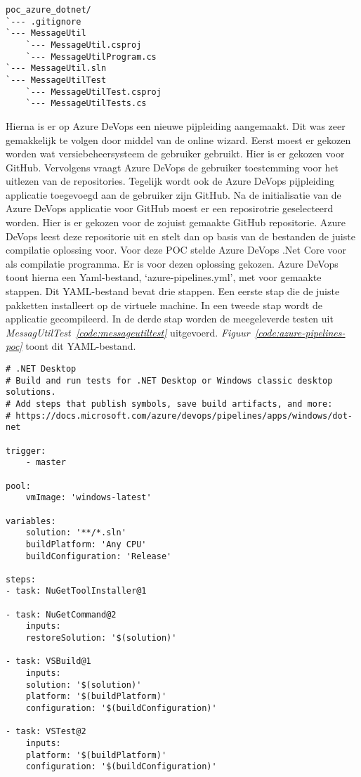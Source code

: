 \begin{lstlisting}
poc_azure_dotnet/
`--- .gitignore
`--- MessageUtil
    `--- MessageUtil.csproj
    `--- MessageUtilProgram.cs
`--- MessageUtil.sln
`--- MessageUtilTest
    `--- MessageUtilTest.csproj
    `--- MessageUtilTests.cs
\end{lstlisting}

Hierna is er op Azure DeVops een nieuwe pijpleiding aangemaakt. Dit was zeer gemakkelijk te volgen door middel van de online wizard. Eerst moest er gekozen worden wat versiebeheersysteem de gebruiker gebruikt. Hier is er gekozen voor GitHub. Vervolgens vraagt Azure DeVops de gebruiker toestemming voor het uitlezen van de repositories. Tegelijk wordt ook de Azure DeVops pijpleiding applicatie toegevoegd aan de gebruiker zijn GitHub. Na de initialisatie van de Azure DeVops applicatie voor GitHub moest er een reposirotrie geselecteerd worden. Hier is er gekozen voor de zojuist gemaakte GitHub repositorie. Azure DeVops leest deze repositorie uit en stelt dan op basis van de bestanden de juiste compilatie oplossing voor. Voor deze POC stelde Azure DeVops .Net Core voor als compilatie programma. Er is voor dezen oplossing gekozen. Azure DeVops toont hierna een Yaml-bestand, ‘azure-pipelines.yml’, met voor gemaakte stappen. Dit YAML-bestand bevat drie stappen. Een eerste stap die de juiste pakketten installeert op de virtuele machine. In een tweede stap wordt de applicatie gecompileerd. In de derde stap worden de meegeleverde testen uit \emph{MessagUtilTest~\ref{code:messageutiltest}} uitgevoerd. \emph{Figuur~\ref{code:azure-pipelines-poc}} toont dit YAML-bestand.

\begin{lstlisting}
# .NET Desktop
# Build and run tests for .NET Desktop or Windows classic desktop solutions.
# Add steps that publish symbols, save build artifacts, and more:
# https://docs.microsoft.com/azure/devops/pipelines/apps/windows/dot-net

trigger:
    - master

pool:
    vmImage: 'windows-latest'

variables:
    solution: '**/*.sln'
    buildPlatform: 'Any CPU'
    buildConfiguration: 'Release'

steps:
- task: NuGetToolInstaller@1

- task: NuGetCommand@2
    inputs:
    restoreSolution: '$(solution)'

- task: VSBuild@1
    inputs:
    solution: '$(solution)'
    platform: '$(buildPlatform)'
    configuration: '$(buildConfiguration)'

- task: VSTest@2
    inputs:
    platform: '$(buildPlatform)'
    configuration: '$(buildConfiguration)'
\end{lstlisting}


